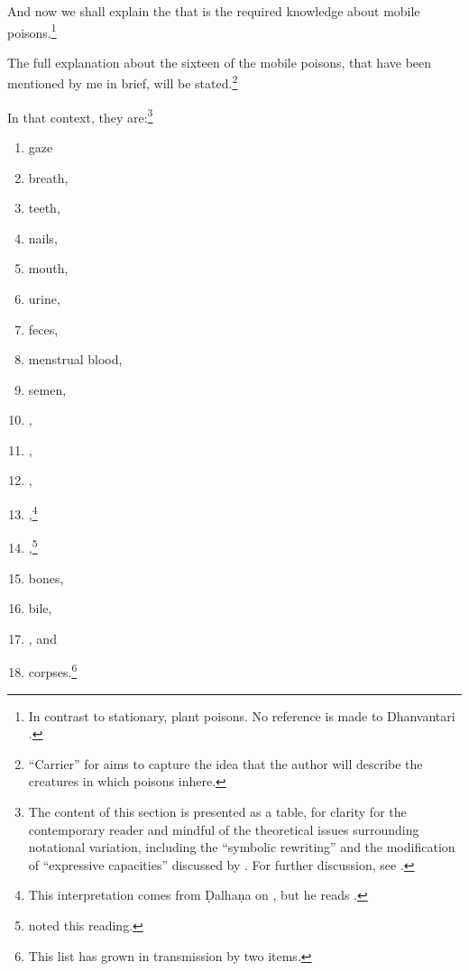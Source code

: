 \begin{translation}
  
  \item[1] 
  
And now we shall explain the  that is the
required knowledge about mobile poisons.\footnote{In contrast to
    stationary, plant poisons.  No reference is made to Dhanvantari
    \citep[see][]{birc-2021}.}

  \item[3] 
  
The full explanation about the sixteen  of
the mobile poisons, that have been mentioned by me in brief, will be
stated.\footnote{“Carrier” for  aims
    to capture the idea that the author will describe the creatures in
    which poisons inhere.}
  
\item[4] 

In that context, they are:\footnote{The content of this section is
    presented as a table, for clarity for the contemporary reader and
    mindful of the theoretical issues surrounding notational variation,
    including the “symbolic rewriting” and the modification of “expressive
    capacities” discussed by \citet[321\,ff]{saru-2016}.  For further
    discussion, see \cite[81--83]{wuja-2021}.}
  \begin{multicols}{2}
      
  \begin{enumerate} 
      
      \item gaze       				%
      \item  breath,       			%
  \item teeth, 						%
      \item nails, 					%
      \item mouth,      			%
      \item urine,					%
      \item feces,					%
    \item menstrual blood,  %
    \item semen,					%
    \item {},				%
   \item {}, %
  \item {},  %
  \item {},\footnote{This interpretation  comes from
    Ḍalhaṇa on , but he reads .} %
   \item {},\footnote{ noted this 
   reading.} %
\item  bones, %
\item  bile, %
\item  {}, and  %
\item corpses.\footnote{This list has grown in transmission by two items.}  
\end{enumerate} 
\end{multicols} 


\end{translation}
